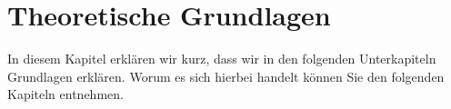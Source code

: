 \chapter{Theoretische Grundlagen}\label{c:Grundlagen}

In diesem Kapitel erklären wir kurz, dass wir in den folgenden Unterkapiteln Grundlagen erklären. Worum es sich hierbei handelt können Sie den folgenden Kapiteln entnehmen.





